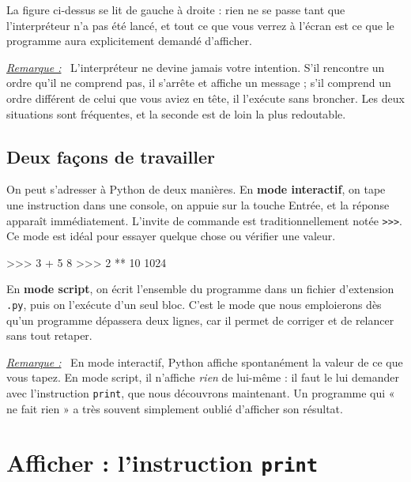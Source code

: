 \documentclass[a4paper,11pt,openany]{book}
\newcommand{\mot}[1]{\textcolor{rougecours}{\textbf{#1}}}
\newcommand{\code}[1]{\texttt{\textcolor{codebleu}{#1}}}
\newenvironment{remarque}%
 {\par\vspace{1mm}\begin{list}{}{\leftmargin=1cm \rightmargin=0.5cm}\item[]%
  \textit{\underline{Remarque :}}~}%
 {\end{list}\vspace{1mm}}
\begin{document}
La figure ci-dessus se lit de gauche à droite : rien ne se passe tant que l'interpréteur n'a pas été lancé, et tout ce que vous verrez à l'écran est ce que le programme aura explicitement demandé d'afficher.

\begin{remarque}
L'interpréteur ne devine jamais votre intention. S'il rencontre un ordre qu'il ne comprend pas, il s'arrête et affiche un message ; s'il comprend un ordre différent de celui que vous aviez en tête, il l'exécute sans broncher. Les deux situations sont fréquentes, et la seconde est de loin la plus redoutable.
\end{remarque}

\subsection{Deux façons de travailler}

On peut s'adresser à Python de deux manières. En \mot{mode interactif}, on tape une instruction dans une console, on appuie sur la touche Entrée, et la réponse apparaît immédiatement. L'invite de commande est traditionnellement notée \code{>{}>{}>}. Ce mode est idéal pour essayer quelque chose ou vérifier une valeur.

\begin{sortie}
>>> 3 + 5
8
>>> 2 ** 10
1024
\end{sortie}

En \mot{mode script}, on écrit l'ensemble du programme dans un fichier d'extension \code{.py}, puis on l'exécute d'un seul bloc. C'est le mode que nous emploierons dès qu'un programme dépassera deux lignes, car il permet de corriger et de relancer sans tout retaper.

\begin{remarque}
En mode interactif, Python affiche spontanément la valeur de ce que vous tapez. En mode script, il n'affiche \emph{rien} de lui-même : il faut le lui demander avec l'instruction \code{print}, que nous découvrons maintenant. Un programme qui « ne fait rien » a très souvent simplement oublié d'afficher son résultat.
\end{remarque}

\section[Afficher avec print]{Afficher : l'instruction \texttt{print}}
\end{document}
